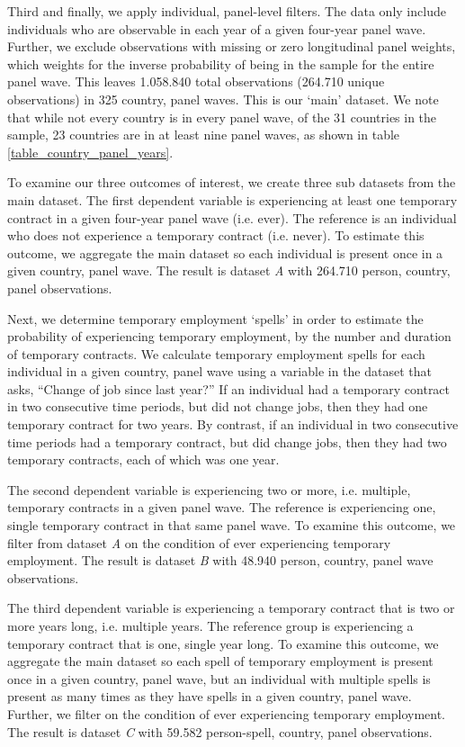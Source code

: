 Third and finally, we apply individual, panel-level filters.  The data only include individuals who are observable in each year of a given four-year panel wave.  Further, we exclude observations with missing or zero longitudinal panel weights, which weights for the inverse probability of being in the sample for the entire panel wave.  This leaves 1.058.840 total observations (264.710 unique observations) in 325 country, panel waves.  This is our `main' dataset.  We note that while not every country is in every panel wave, of the 31 countries in the sample, 23 countries are in at least nine panel waves, as shown in table \ref{table_country_panel_years}.  

To examine our three outcomes of interest, we create three sub datasets from the main dataset.  The first dependent variable is experiencing at least one temporary contract in a given four-year panel wave (i.e. ever).  The reference is an individual who does not experience a temporary contract (i.e. never).  To estimate this outcome, we aggregate the main dataset so each individual is present once in a given country, panel wave.  The result is dataset \emph{A} with 264.710 person, country, panel observations.  

Next, we determine temporary employment `spells' in order to estimate the probability of experiencing temporary employment, by the number and duration of temporary contracts.  We calculate temporary employment spells for each individual in a given country, panel wave using a variable in the dataset that asks, ``Change of job since last year?''  If an individual had a temporary contract in two consecutive time periods, but did not change jobs, then they had one temporary contract for two years.  By contrast, if an individual in two consecutive time periods had a temporary contract, but did change jobs, then they had two temporary contracts, each of which was one year.

The second dependent variable is experiencing two or more, i.e. multiple, temporary contracts in a given panel wave.  The reference is experiencing one, single temporary contract in that same panel wave.  To examine this outcome, we filter from dataset \emph{A} on the condition of ever experiencing temporary employment.  The result is dataset \emph{B} with 48.940 person, country, panel wave observations.  

The third dependent variable is experiencing a temporary contract that is two or more years long, i.e. multiple years.  The reference group is experiencing a temporary contract that is one, single year long.  To examine this outcome, we aggregate the main dataset so each spell of temporary employment is present once in a given country, panel wave, but an individual with multiple spells is present as many times as they have spells in a given country, panel wave.  Further, we filter on the condition of ever experiencing temporary employment.  The result is dataset \emph{C} with 59.582 person-spell, country, panel observations. 

